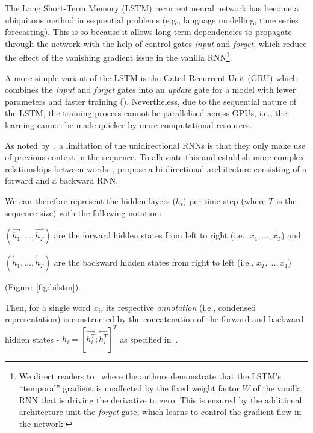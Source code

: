 The Long Short-Term Memory (LSTM) recurrent neural network has become a ubiquitous method in sequential problems (e.g., language modelling, time series forecasting).
This is so because it allows long-term dependencies to propagate through the network with the help of control gates \- \emph{input} and \emph{forget}, which reduce the effect of the vanishing gradient issue in the vanilla RNN\footnote{
    We direct readers to~\cite{bayer2015learning} where the authors demonstrate that the LSTM's \enquote{temporal} gradient is unaffected by the fixed weight factor $W$ of the vanilla RNN that is driving the derivative to zero. 
    This is ensured by the additional architecture unit \- the \emph{forget} gate, which learns to  control the gradient flow in the network.
}.

A more simple variant of the LSTM is the Gated Recurrent Unit (GRU) which combines the \emph{input} and \emph{forget} gates into an \emph{update} gate for a model with fewer parameters and faster training (\cite{cahuantzi2021gru}).
Nevertheless, due to the sequential nature of the LSTM, the training process cannot be parallelised across GPUs, i.e., the learning cannot be made quicker by more computational resources.

As noted by~\cite{graveshinton2013speech}, a limitation of the unidirectional RNNs is that they only make use of previous context in the sequence.
To alleviate this and establish more complex relationships between words~\cite{schuster1997birnn}, propose a bi-directional architecture consisting of a forward and a backward RNN\@.

We can therefore represent the hidden layers ($h_i$) per time-step (where $T$ is the sequence size) with the following notation: \begin{enumerate*}
    \item $(\overset{\longrightarrow}{h_1}, \ldots, \overset{\longrightarrow}{h_T})$ are the forward hidden states from left to right (i.e., $x_1,\ldots,x_T$) and
    \item $(\overset{\longleftarrow}{h_1}, \ldots, \overset{\longleftarrow}{h_T})$ are the backward hidden states from right to left (i.e., $x_T,\ldots,x_1$)
\end{enumerate*} (Figure~\ref{fig:bilstm}).

Then, for a single word $x_i$, its respective \emph{annotation} (i.e., condensed representation) is constructed by the concatenation of the forward and backward hidden states - $h_i = [\overset{\longrightarrow}{h_i^T}; \overset{\longleftarrow}{h_i^T}]^T$ as specified in~\cite{bahdanau2016neural}.


